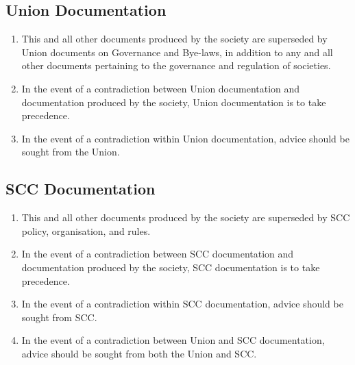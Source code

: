 \documentclass{scrartcl}
\begin{document}
        \subsection{Union Documentation}
            \label{documentation--union}
            \begin{enumerate}
                \item This and all other documents produced by the society are superseded by Union documents on Governance and Bye-laws, in addition to any and all other documents pertaining to the governance and regulation of societies.
                \item In the event of a contradiction between Union documentation and documentation produced by the society, Union documentation is to take precedence.
                \item In the event of a contradiction within Union documentation, advice should be sought from the Union.
            \end{enumerate}

        \subsection{SCC Documentation}
            \label{documentation--scc}
            \begin{enumerate}
                \item This and all other documents produced by the society are superseded by SCC policy, organisation, and rules.
                \item In the event of a contradiction between SCC documentation and documentation produced by the society, SCC documentation is to take precedence.
                \item In the event of a contradiction within SCC documentation, advice should be sought from SCC.
                \item In the event of a contradiction between Union and SCC documentation, advice should be sought from both the Union and SCC.
            \end{enumerate}
\end{document}
